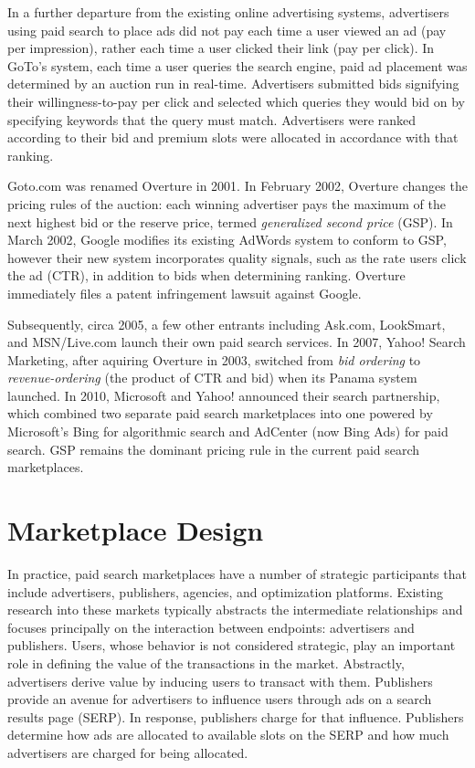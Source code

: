 \documentclass[prodmode,acmtist]{acmsmall} %
\begin{document}
In a further departure from the existing online advertising systems, advertisers using paid search to place ads did not pay each time a user viewed an ad (pay per impression), rather each time a user clicked their link (pay per click).
In GoTo's system, each time a user queries the search engine, paid ad placement was determined by an auction run in real-time.
Advertisers submitted bids signifying their willingness-to-pay per click and selected which queries they would bid on by specifying keywords that the query must match.
Advertisers were ranked according to their bid and premium slots were allocated in accordance with that ranking. 

Goto.com was renamed Overture in 2001.
In February 2002, Overture changes the pricing rules of the auction: each winning advertiser pays the maximum of the next highest bid or the reserve price, termed \emph{generalized second price} (GSP).
In March 2002, Google modifies its existing AdWords system to conform to GSP, however their new system incorporates quality signals, such as the rate users click the ad (CTR), in addition to bids when determining ranking. 
Overture immediately files a patent infringement lawsuit against Google.


Subsequently, circa 2005, a few other entrants including Ask.com, LookSmart, and MSN/Live.com launch their own paid search services.
In 2007, Yahoo! Search Marketing, after aquiring Overture in 2003, switched from \emph{bid ordering} to \emph{revenue-ordering} (the product of CTR and bid) when its Panama system launched. 
In 2010, Microsoft and Yahoo! announced their search partnership, which combined two separate paid search marketplaces into one powered by Microsoft's Bing for algorithmic search and AdCenter (now Bing Ads) for paid search. 
GSP remains the dominant pricing rule in the current paid search marketplaces.


\section{Marketplace Design} %
\label{sec:auction_and_marketplace_design}

In practice, paid search marketplaces have a number of strategic participants that include advertisers, publishers, agencies, and optimization platforms.  
Existing research into these markets typically abstracts the intermediate relationships and focuses principally on the interaction between endpoints: advertisers and publishers.  
Users, whose behavior is not considered strategic, play an important role in defining the value of the transactions in the market. 
Abstractly, advertisers derive value by inducing users to transact with them.  
Publishers provide an avenue for advertisers to influence users through ads on a search results page (SERP).  
In response, publishers charge for that influence.  Publishers determine how ads are allocated to available slots on the SERP and how much advertisers are charged for being allocated. 
\end{document}
